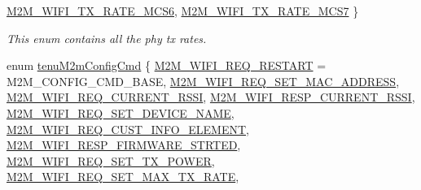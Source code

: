 \begin{DoxyCompactItemize}
\hyperlink{group__WlanEnums_gga93cc7cca5e41a62c610de1e30ab38b96a72301fcda29bf62bfca426233b721f39}{M2\+M\+\_\+\+W\+I\+F\+I\+\_\+\+T\+X\+\_\+\+R\+A\+T\+E\+\_\+\+M\+C\+S6}, 
\hyperlink{group__WlanEnums_gga93cc7cca5e41a62c610de1e30ab38b96a484c6e3a33234470bb054ef54645aebe}{M2\+M\+\_\+\+W\+I\+F\+I\+\_\+\+T\+X\+\_\+\+R\+A\+T\+E\+\_\+\+M\+C\+S7}
 \}\begin{DoxyCompactList}\small\item\em This enum contains all the phy tx rates. \end{DoxyCompactList}
\item 
enum \hyperlink{group__WlanEnums_ga57466b36df595c593e7ccc9892e14b20}{tenu\+M2m\+Config\+Cmd} \{ \newline
\hyperlink{group__WlanEnums_gga57466b36df595c593e7ccc9892e14b20aed0bba9156ed61dc387ed73844ae2074}{M2\+M\+\_\+\+W\+I\+F\+I\+\_\+\+R\+E\+Q\+\_\+\+R\+E\+S\+T\+A\+RT} = M2\+M\+\_\+\+C\+O\+N\+F\+I\+G\+\_\+\+C\+M\+D\+\_\+\+B\+A\+SE, 
\hyperlink{group__WlanEnums_gga57466b36df595c593e7ccc9892e14b20a4c2ce5f4fc68f7958e12632e45587b31}{M2\+M\+\_\+\+W\+I\+F\+I\+\_\+\+R\+E\+Q\+\_\+\+S\+E\+T\+\_\+\+M\+A\+C\+\_\+\+A\+D\+D\+R\+E\+SS}, 
\hyperlink{group__WlanEnums_gga57466b36df595c593e7ccc9892e14b20a53bc10f0a87f11ba6b111321d362fc66}{M2\+M\+\_\+\+W\+I\+F\+I\+\_\+\+R\+E\+Q\+\_\+\+C\+U\+R\+R\+E\+N\+T\+\_\+\+R\+S\+SI}, 
\hyperlink{group__WlanEnums_gga57466b36df595c593e7ccc9892e14b20ae2f28d3ff5c4356502abfc26d8f6e5f1}{M2\+M\+\_\+\+W\+I\+F\+I\+\_\+\+R\+E\+S\+P\+\_\+\+C\+U\+R\+R\+E\+N\+T\+\_\+\+R\+S\+SI}, 
\newline
\hyperlink{group__WlanEnums_gga57466b36df595c593e7ccc9892e14b20a9c8b2c2704ec40baffa44f95e1e3a88e}{M2\+M\+\_\+\+W\+I\+F\+I\+\_\+\+R\+E\+Q\+\_\+\+S\+E\+T\+\_\+\+D\+E\+V\+I\+C\+E\+\_\+\+N\+A\+ME}, 
\hyperlink{group__WlanEnums_gga57466b36df595c593e7ccc9892e14b20a88cfe379491a57588e4b16271390cedb}{M2\+M\+\_\+\+W\+I\+F\+I\+\_\+\+R\+E\+Q\+\_\+\+C\+U\+S\+T\+\_\+\+I\+N\+F\+O\+\_\+\+E\+L\+E\+M\+E\+NT}, 
\hyperlink{group__WlanEnums_gga57466b36df595c593e7ccc9892e14b20a71745d4c66d95eca1782fa6fa3ba0cac}{M2\+M\+\_\+\+W\+I\+F\+I\+\_\+\+R\+E\+S\+P\+\_\+\+F\+I\+R\+M\+W\+A\+R\+E\+\_\+\+S\+T\+R\+T\+ED}, 
\hyperlink{group__WlanEnums_gga57466b36df595c593e7ccc9892e14b20a712d36cb116cadd83ccedc2be4dd586c}{M2\+M\+\_\+\+W\+I\+F\+I\+\_\+\+R\+E\+Q\+\_\+\+S\+E\+T\+\_\+\+T\+X\+\_\+\+P\+O\+W\+ER}, 
\newline
\hyperlink{group__WlanEnums_gga57466b36df595c593e7ccc9892e14b20a031094b619d95c19dc52b31da7c36730}{M2\+M\+\_\+\+W\+I\+F\+I\+\_\+\+R\+E\+Q\+\_\+\+S\+E\+T\+\_\+\+M\+A\+X\+\_\+\+T\+X\+\_\+\+R\+A\+TE}, 

\end{DoxyCompactItemize}
